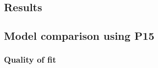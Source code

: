 \begin{multicols}{2}

\section{Results}
\label{sec:results}





\subsection{Model comparison using P15}
\label{sec:P15_fit}
\subsubsection{Quality of fit}


\end{multicols}
